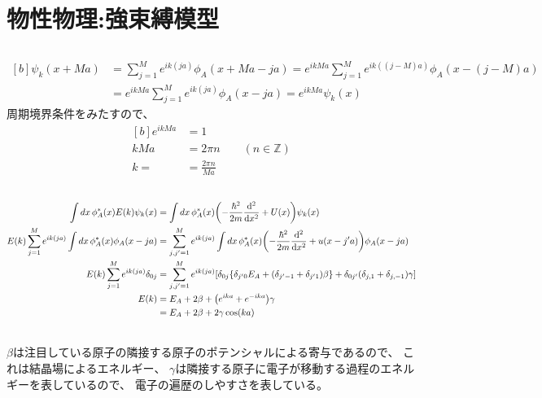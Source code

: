 \documentclass[../ap_2012.tex]{subfiles}
\begin{document}
\setcounter{chapter}{3}
\chapter{物性物理:強束縛模型}
\section{}
\begin{equation}\begin{aligned}[b]
    \psi_k(x+Ma)&=\sum_{j=1}^{M}e^{ik(ja)}\phi_A(x+Ma-ja)
    =e^{ik Ma}\sum_{j=1}^{M}e^{ik((j-M)a)}\phi_A(x-(j-M)a)\\
    &=e^{ikMa}\sum_{j=1}^{M}e^{ik(ja)}\phi_A(x-ja)
    = e^{ikMa}\psi_k(x)
\end{aligned}\end{equation}
周期境界条件をみたすので、
\begin{equation}\begin{aligned}[b]
    e^{ikMa} &= 1\\
    kMa &= 2\pi n\qquad(n\in\mathbb{Z})\\
    k = &= \frac{2\pi n}{Ma}
\end{aligned}\end{equation}

\section{}
\begin{equation}\begin{aligned}[b]
    \int dx\, \phi_A^*(x) E(k) \psi_k(x)
        &=\int dx\, \phi_A^*(x)\qty(-\frac{\hbar^2}{2m}\dv[2]{x}+U(x))\psi_k(x)\\
    E(k)\sum_{j=1}^{M}e^{ik(ja)}\int dx\,\phi_A^*(x)\phi_A(x-ja)
        &=\sum_{j,j'=1}^M e^{ik(ja)}\int dx\,\phi_A^*(x)\qty(-\frac{\hbar^2}{2m}\dv[2]{x}+u(x-j'a))\phi_A(x-ja)\\
    E(k)\sum_{j=1}^{M}e^{ik(ja)}\delta_{0j}
        &=\sum_{j,j'=1}^M e^{ik(ja)}\qty[
            \delta_{0j}\qty{\delta_{j'0}E_A+(\delta_{j'-1}+\delta_{j'1})\beta}
            +\delta_{0j'}(\delta_{j,1}+\delta_{j,-1})\gamma]\\
    E(k) &= E_A+2\beta+\qty(e^{ika}+e^{-ika})\gamma\\
    &= E_A + 2\beta +2\gamma\cos(ka)
\end{aligned}\end{equation}

\section{}
\(\beta\)は注目している原子の隣接する原子のポテンシャルによる寄与であるので、
これは結晶場によるエネルギー、
\(\gamma\)は隣接する原子に電子が移動する過程のエネルギーを表しているので、
電子の遍歴のしやすさを表している。
\end{document}
